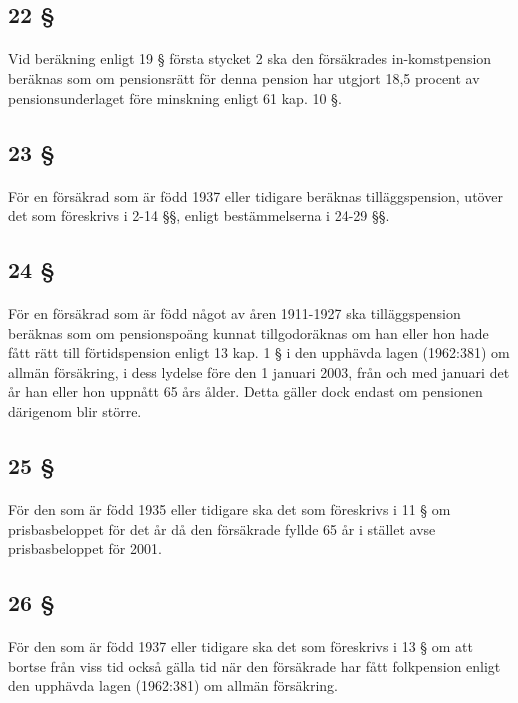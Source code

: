 \documentclass[a4paper,notitlepage,openany,10pt]{book}
\begin{document}
\subsection*{22 §}
\paragraph*{}
Vid beräkning enligt 19 § första stycket 2 ska den försäkrades in-komstpension beräknas som om pensionsrätt för denna pension har utgjort 18,5 procent av pensionsunderlaget före minskning enligt 61 kap. 10 §.
\subsection*{23 §}
\paragraph*{}
För en försäkrad som är född 1937 eller tidigare beräknas tilläggspension, utöver det som föreskrivs i 2-14 §§, enligt bestämmelserna i 24-29 §§.
\subsection*{24 §}
\paragraph*{}
För en försäkrad som är född något av åren 1911-1927 ska tilläggspension beräknas som om pensionspoäng kunnat tillgodoräknas om han eller hon hade fått rätt till förtidspension enligt 13 kap. 1 § i den upphävda lagen (1962:381) om allmän försäkring, i dess lydelse före den 1 januari 2003, från och med januari det år han eller hon uppnått 65 års ålder. Detta gäller dock endast om pensionen därigenom blir större.
\subsection*{25 §}
\paragraph*{}
För den som är född 1935 eller tidigare ska det som föreskrivs i 11 § om prisbasbeloppet för det år då den försäkrade fyllde 65 år i stället avse prisbasbeloppet för 2001.
\subsection*{26 §}
\paragraph*{}
För den som är född 1937 eller tidigare ska det som föreskrivs i 13 § om att bortse från viss tid också gälla tid när den försäkrade har fått folkpension enligt den upphävda lagen (1962:381) om allmän försäkring.
\end{document}
